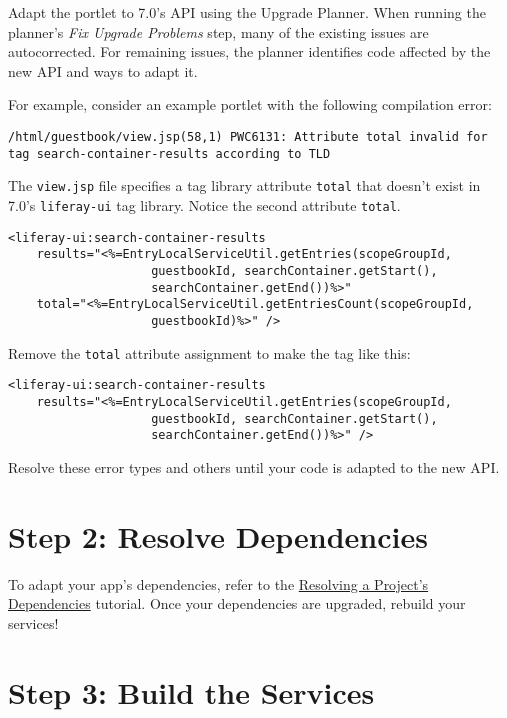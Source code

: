 Adapt the portlet to 7.0's API using the Upgrade Planner. When running
the planner's \emph{Fix Upgrade Problems} step, many of the existing
issues are autocorrected. For remaining issues, the planner identifies
code affected by the new API and ways to adapt it.

For example, consider an example portlet with the following compilation
error:

\begin{verbatim}
/html/guestbook/view.jsp(58,1) PWC6131: Attribute total invalid for tag search-container-results according to TLD
\end{verbatim}

The \texttt{view.jsp} file specifies a tag library attribute
\texttt{total} that doesn't exist in 7.0's \texttt{liferay-ui} tag
library. Notice the second attribute \texttt{total}.

\begin{verbatim}
<liferay-ui:search-container-results
    results="<%=EntryLocalServiceUtil.getEntries(scopeGroupId,
                    guestbookId, searchContainer.getStart(),
                    searchContainer.getEnd())%>"
    total="<%=EntryLocalServiceUtil.getEntriesCount(scopeGroupId,
                    guestbookId)%>" />
\end{verbatim}

Remove the \texttt{total} attribute assignment to make the tag like
this:

\begin{verbatim}
<liferay-ui:search-container-results
    results="<%=EntryLocalServiceUtil.getEntries(scopeGroupId,
                    guestbookId, searchContainer.getStart(),
                    searchContainer.getEnd())%>" />
\end{verbatim}

Resolve these error types and others until your code is adapted to the
new API.

\section{Step 2: Resolve
Dependencies}\label{step-2-resolve-dependencies}

To adapt your app's dependencies, refer to the
\href{/docs/7-2/tutorials/-/knowledge_base/t/resolving-a-projects-dependencies}{Resolving
a Project's Dependencies} tutorial. Once your dependencies are upgraded,
rebuild your services!

\section{Step 3: Build the Services}\label{step-3-build-the-services}

